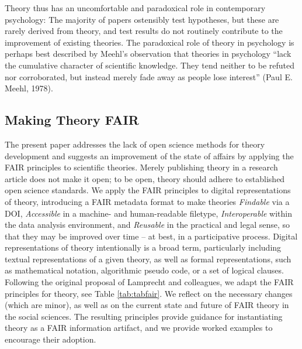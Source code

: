 \documentclass[
  man,floatsintext]{apa6}
\begin{document}
Theory thus has an uncomfortable and paradoxical role in contemporary psychology:
The majority of papers ostensibly test hypotheses,
but these are rarely derived from theory,
and test results do not routinely contribute to the improvement of existing theories.
The paradoxical role of theory in psychology is perhaps best described by Meehl's observation that theories in psychology ``lack the cumulative character of scientific knowledge. They tend neither to be refuted nor corroborated, but instead merely fade away as people lose interest'' (Paul E. Meehl, 1978).

\subsection{Making Theory FAIR}\label{making-theory-fair}

The present paper addresses the lack of open science methods for theory development and suggests an improvement of the state of affairs by applying the FAIR principles to scientific theories.
Merely publishing theory in a research article does not make it open;
to be open, theory should adhere to established open science standards.
We apply the FAIR principles to digital representations of theory,
introducing a FAIR metadata format to make theories \emph{Findable} via a DOI,
\emph{Accessible} in a machine- and human-readable filetype,
\emph{Interoperable} within the data analysis environment,
and \emph{Reusable} in the practical and legal sense, so that they may be improved over time -- at best, in a participative process.
Digital representations of theory intentionally is a broad term, particularly including textual representations of a given theory, as well as formal representations, such as mathematical notation, algorithmic pseudo code, or a set of logical clauses.
Following the original proposal of Lamprecht and colleagues,
we adapt the FAIR principles for theory, see Table \ref{tab:tabfair}.
We reflect on the necessary changes (which are minor),
as well as on the current state and future of FAIR theory in the social sciences.
The resulting principles provide guidance for instantiating theory as a FAIR information artifact,
and we provide worked examples to encourage their adoption.
\end{document}
